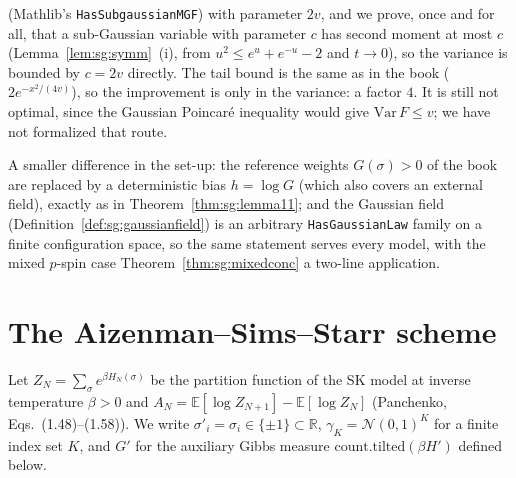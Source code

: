 \begin{remark}
\begin{enumerate}
(Mathlib's \texttt{HasSubgaussianMGF}) with parameter $2v$, and we prove, once and for all, that a sub-Gaussian variable with parameter $c$ has second
moment at most $c$ (Lemma~\ref{lem:sg:symm}~(i), from $u^2\le e^u+e^{-u}-2$ and $t\to0$), so the variance is bounded by $c=2v$ directly. The tail bound
is the same as in the book ($2e^{-x^2/(4v)}$), so the improvement is only in the variance: a factor $4$. It is still not optimal, since the Gaussian
Poincar\'e inequality would give $\mathrm{Var}\,F\le v$; we have not formalized that route.
\end{enumerate}
A smaller difference in the set-up: the reference weights $G(\sigma)>0$ of the book are replaced by a deterministic bias $h=\log G$ (which also covers an external
field), exactly as in Theorem~\ref{thm:sg:lemma11}; and the Gaussian field (Definition~\ref{def:sg:gaussianfield}) is an arbitrary \texttt{HasGaussianLaw} family on a finite configuration space, so the same
statement serves every model, with the mixed $p$-spin case Theorem~\ref{thm:sg:mixedconc} a two-line application.
\end{remark}

\section{The Aizenman--Sims--Starr scheme}\label{sec:sg:ass}

Let $Z_N=\sum_\sigma e^{\beta H_N(\sigma)}$ be the partition function of the SK model at inverse temperature $\beta>0$ and
$A_N=\mathbb E[\log Z_{N+1}]-\mathbb E[\log Z_N]$ (Panchenko, Eqs.~(1.48)--(1.58)). We write $\sigma'_i=\sigma_i\in\{\pm1\}\subset\mathbb R$,
$\gamma_K=\mathcal N(0,1)^{K}$ for a finite index set $K$, and $G'$ for the auxiliary Gibbs measure
$\mathrm{count.tilted}(\beta H')$ defined below.

